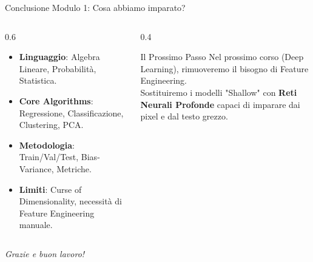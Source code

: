 \documentclass[aspectratio=169, 10pt]{beamer}
\begin{document}
\begin{frame}{Conclusione Modulo 1: Cosa abbiamo imparato?}
    \begin{columns}[T]
        \begin{column}{0.6\textwidth}
            \begin{itemize}
                \item \textbf{Linguaggio}: Algebra Lineare, Probabilità, Statistica.
                \item \textbf{Core Algorithms}: Regressione, Classificazione, Clustering, PCA.
                \item \textbf{Metodologia}: Train/Val/Test, Bias-Variance, Metriche.
                \item \textbf{Limiti}: Curse of Dimensionality, necessità di Feature Engineering manuale.
            \end{itemize}
        \end{column}
        \begin{column}{0.4\textwidth}
            \begin{alertblock}{Il Prossimo Passo}
                Nel prossimo corso (Deep Learning), rimuoveremo il bisogno di Feature Engineering.
                \\ \vspace{0.5em}
                Sostituiremo i modelli "Shallow" con \textbf{Reti Neurali Profonde} capaci di imparare dai pixel e dal testo grezzo.
            \end{alertblock}
        \end{column}
    \end{columns}
    
    \vspace{1em}
    \centering
    \textit{Grazie e buon lavoro!}
\end{frame}
\end{document}
